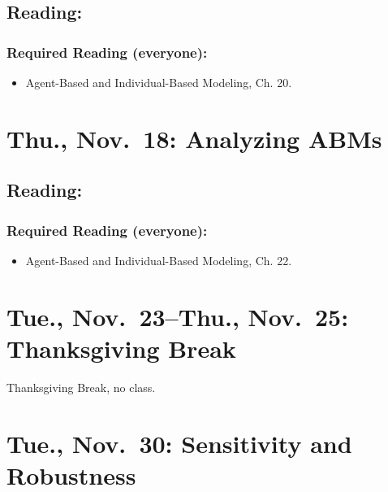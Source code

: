 \documentclass[
]{article}
\providecommand{\tightlist}{%
  \setlength{\itemsep}{0pt}\setlength{\parskip}{0pt}}
\begin{document}
\hypertarget{reading-22}{%
\subsection{Reading:}\label{reading-22}}

\hypertarget{required-reading-everyone-19}{%
\subsubsection{Required Reading
(everyone):}\label{required-reading-everyone-19}}

\begin{itemize}
\tightlist
\item
  Agent-Based and Individual-Based Modeling, Ch. 20.
\end{itemize}

\hypertarget{thu.-nov.-18-analyzing-abms}{%
\section{Thu., Nov.~18: Analyzing
ABMs}\label{thu.-nov.-18-analyzing-abms}}

\hypertarget{reading-23}{%
\subsection{Reading:}\label{reading-23}}

\hypertarget{required-reading-everyone-20}{%
\subsubsection{Required Reading
(everyone):}\label{required-reading-everyone-20}}

\begin{itemize}
\tightlist
\item
  Agent-Based and Individual-Based Modeling, Ch. 22.
\end{itemize}

\hypertarget{tue.-nov.-23thu.-nov.-25-thanksgiving-break}{%
\section{Tue., Nov.~23--Thu., Nov.~25: Thanksgiving
Break}\label{tue.-nov.-23thu.-nov.-25-thanksgiving-break}}

Thanksgiving Break, no class.

\hypertarget{tue.-nov.-30-sensitivity-and-robustness}{%
\section{Tue., Nov.~30: Sensitivity and
Robustness}\label{tue.-nov.-30-sensitivity-and-robustness}}
\end{document}
